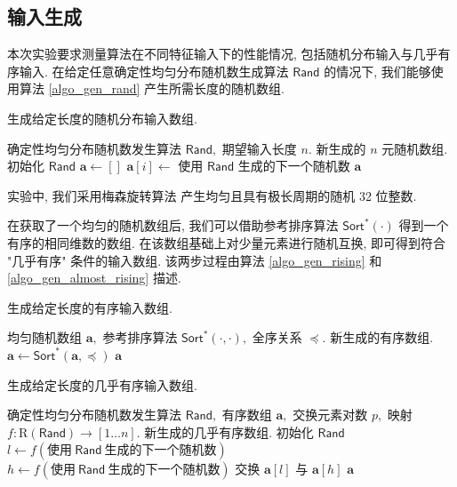 \documentclass[12pt]{article}
\begin{document}
\subsection{输入生成}

本次实验要求测量算法在不同特征输入下的性能情况, 包括随机分布输入与几乎有序输入. 在给定任意确定性均匀分布随机数生成算法 $\mathsf{Rand}$ 的情况下, 我们能够使用算法 \ref{algo_gen_rand} 产生所需长度的随机数组.

\begin{algorithm}[H]
\caption{生成给定长度的随机分布输入数组.}
\label{algo_gen_rand}
\begin{algorithmic}[1]
\Require 确定性均匀分布随机数发生算法 $\mathsf{Rand},$ 期望输入长度 $n.$
\Ensure 新生成的 $n$ 元随机数组.
\State 初始化 $\mathsf{Rand}$
\State $\bm{a} \gets []$
    \State $\bm{a}[i] \gets$ 使用 $\mathsf{Rand}$ 生成的下一个随机数
\EndFor
\State \Return $\bm{a}$
\end{algorithmic}
\end{algorithm}

实验中, 我们采用梅森旋转算法 \cite{bib_mersenne_randgen} 产生均匀且具有极长周期的随机 32 位整数.

在获取了一个均匀的随机数组后, 我们可以借助参考排序算法 $\mathsf{Sort}^*(\cdot)$ 得到一个有序的相同维数的数组. 在该数组基础上对少量元素进行随机互换, 即可得到符合 "几乎有序" 条件的输入数组. 该两步过程由算法 \ref{algo_gen_rising} 和 \ref{algo_gen_almost_rising} 描述.

\begin{algorithm}[H]
\caption{生成给定长度的有序输入数组.}
\label{algo_gen_rising}
\begin{algorithmic}[1]
\Require 均匀随机数组 $\bm{a},$ 参考排序算法 $\mathsf{Sort}^*(\cdot, \cdot),$ 全序关系 $\preceq.$
\Ensure 新生成的有序数组.
\State $\bm{a} \gets \mathsf{Sort}^*(\bm{a}, \preceq)$
\State \Return $\bm{a}$
\end{algorithmic}
\end{algorithm}
\begin{algorithm}
\caption{生成给定长度的几乎有序输入数组.}
\label{algo_gen_almost_rising}
\begin{algorithmic}[1]
\Require 确定性均匀分布随机数发生算法 $\mathsf{Rand},$ 有序数组 $\bm{a},$ 交换元素对数 $p,$ 映射 $f: \mathrm{R}(\mathsf{Rand}) \to [1 \dots n].$
\Ensure 新生成的几乎有序数组.
\State 初始化 $\mathsf{Rand}$
    \State $l \gets f(\text{使用}\ \mathsf{Rand}\ \text{生成的下一个随机数})$
    \State $h \gets f(\text{使用}\ \mathsf{Rand}\ \text{生成的下一个随机数})$
    \State 交换 $\bm{a}[l]$ 与 $\bm{a}[h]$
\EndFor
\State \Return $\bm{a}$
\end{algorithmic}
\end{algorithm}
\end{document}
